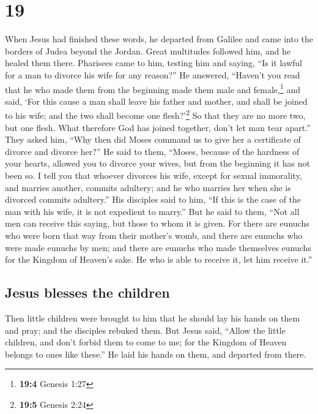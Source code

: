 \hypertarget{section-18}{%
\section{19}\label{section-18}}

 When Jesus had finished these words, he departed from
Galilee and came into the borders of Judea beyond the Jordan.
 Great multitudes followed him, and he healed them there.
 Pharisees came to him, testing him and saying, ``Is it
lawful for a man to divorce his wife for any reason?''  He
answered, ``Haven't you read that he who made them from the beginning
made them male and female,\footnote{\textbf{19:4} Genesis 1:27}
 and said, `For this cause a man shall leave his father
and mother, and shall be joined to his wife; and the two shall become
one flesh?'\footnote{\textbf{19:5} Genesis 2:24}  So that
they are no more two, but one flesh. What therefore God has joined
together, don't let man tear apart.''  They asked him,
``Why then did Moses command us to give her a certificate of divorce and
divorce her?''  He said to them, ``Moses, because of the
hardness of your hearts, allowed you to divorce your wives, but from the
beginning it has not been so.  I tell you that whoever
divorces his wife, except for sexual immorality, and marries another,
commits adultery; and he who marries her when she is divorced commits
adultery.''  His disciples said to him, ``If this is the
case of the man with his wife, it is not expedient to marry.''
 But he said to them, ``Not all men can receive this
saying, but those to whom it is given.  For there are
eunuchs who were born that way from their mother's womb, and there are
eunuchs who were made eunuchs by men; and there are eunuchs who made
themselves eunuchs for the Kingdom of Heaven's sake. He who is able to
receive it, let him receive it.''

\hypertarget{jesus-blesses-the-children}{%
\subsection{Jesus blesses the
children}\label{jesus-blesses-the-children}}

 Then little children were brought to him that he should
lay his hands on them and pray; and the disciples rebuked them.
 But Jesus said, ``Allow the little children, and don't
forbid them to come to me; for the Kingdom of Heaven belongs to ones
like these.''  He laid his hands on them, and departed
from there.

